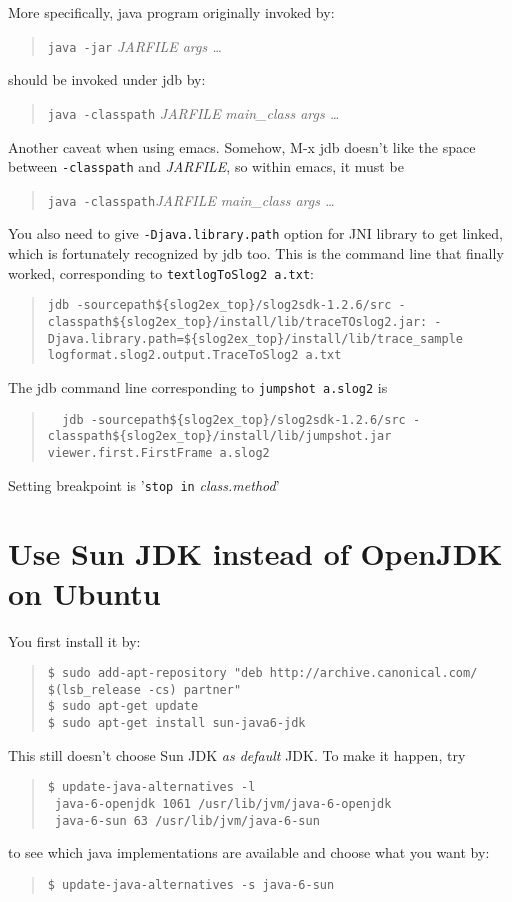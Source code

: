 \documentclass{article}
\begin{document}
More specifically, java program originally invoked by:
\begin{quote}
  {\tt java -jar} {\it JARFILE args \ldots}
\end{quote}
should be invoked under jdb by:
\begin{quote}
  {\tt java -classpath} {\it JARFILE} {\it main\_class args \ldots}
\end{quote}
Another caveat when using emacs.  
Somehow, M-x jdb doesn't like the space between {\tt -classpath} and 
{\it JARFILE}, so within emacs, it must be
\begin{quote}
  {\tt java -classpath}{\it JARFILE} {\it main\_class args \ldots}
\end{quote}
You also need to give {\tt -Djava.library.path} option for JNI library to get
linked, which is fortunately recognized by jdb too.
This is the command line that finally worked, 
corresponding to {\tt textlogToSlog2 a.txt}:

\begin{quote}
\begin{verbatim}
jdb -sourcepath${slog2ex_top}/slog2sdk-1.2.6/src -classpath${slog2ex_top}/install/lib/traceTOslog2.jar: -Djava.library.path=${slog2ex_top}/install/lib/trace_sample logformat.slog2.output.TraceToSlog2 a.txt
\end{verbatim}
\end{quote}
The jdb command line corresponding to {\tt jumpshot a.slog2} is
\begin{quote}
\begin{verbatim}
  jdb -sourcepath${slog2ex_top}/slog2sdk-1.2.6/src -classpath${slog2ex_top}/install/lib/jumpshot.jar viewer.first.FirstFrame a.slog2
\end{verbatim}
\end{quote}  

Setting breakpoint is '{\tt stop in} {\it class.method}'


\section{Use Sun JDK instead of OpenJDK on Ubuntu}
\label{sec:sunjdk}
You first install it by:
\begin{quote}
\begin{verbatim}
$ sudo add-apt-repository "deb http://archive.canonical.com/ $(lsb_release -cs) partner"
$ sudo apt-get update
$ sudo apt-get install sun-java6-jdk
\end{verbatim}
\end{quote}
This still doesn't choose Sun JDK {\it as default} JDK.  To make it happen, try
\begin{quote}
\begin{verbatim}
$ update-java-alternatives -l
 java-6-openjdk 1061 /usr/lib/jvm/java-6-openjdk
 java-6-sun 63 /usr/lib/jvm/java-6-sun
\end{verbatim}
\end{quote}
to see which java implementations are available and choose what you want by:
\begin{quote}
\begin{verbatim}
$ update-java-alternatives -s java-6-sun
\end{verbatim}
\end{quote}  
\end{document}
